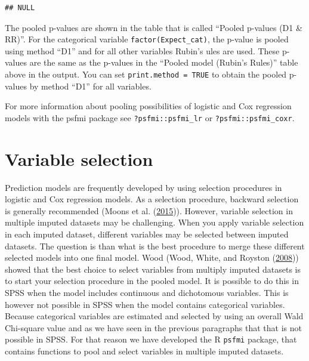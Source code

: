 \documentclass[
]{book}
\newenvironment{Shaded}{\begin{snugshade}}{\end{snugshade}}
\newcommand{\NormalTok}[1]{#1}
\newcommand{\OperatorTok}[1]{\textcolor[rgb]{0.81,0.36,0.00}{\textbf{#1}}}
\begin{document}
\begin{Shaded}
\end{Shaded}

\begin{verbatim}
## NULL
\end{verbatim}

The pooled p-values are shown in the table that is called ``Pooled
p-values (D1 \& RR)''. For the categorical variable
\texttt{factor(Expect\_cat)}, the p-value is pooled using method ``D1''
and for all other variables Rubin's ules are used. These p-values are
the same as the p-values in the ``Pooled model (Rubin's Rules)'' table
above in the output. You can set \texttt{print.method\ =\ TRUE} to
obtain the pooled p-values by method ``D1'' for all variables.

For more information about pooling possibilities of logistic and Cox
regression models with the psfmi package see \texttt{?psfmi::psfmi\_lr}
or \texttt{?psfmi::psfmi\_coxr}.

\hypertarget{variable-selection}{%
\section{Variable selection}\label{variable-selection}}

Prediction models are frequently developed by using selection procedures
in logistic and Cox regression models. As a selection procedure,
backward selection is generally recommended (Moons et al.
(\protect\hyperlink{ref-Moons2015}{2015})). However, variable selection
in multiple imputed datasets may be challenging. When you apply variable
selection in each imputed dataset, different variables may be selected
between imputed datasets. The question is than what is the best
procedure to merge these different selected models into one final model.
Wood (Wood, White, and Royston (\protect\hyperlink{ref-Wood2008}{2008}))
showed that the best choice to select variables from multiply imputed
datasets is to start your selection procedure in the pooled model. It is
possible to do this in SPSS when the model includes continuous and
dichotomous variables. This is however not possible in SPSS when the
model contains categorical variables. Because categorical variables are
estimated and selected by using an overall Wald Chi-square value and as
we have seen in the previous paragraphs that that is not possible in
SPSS. For that reason we have developed the R \texttt{psfmi} package,
that contains functions to pool and select variables in multiple imputed
datasets.
\end{document}
